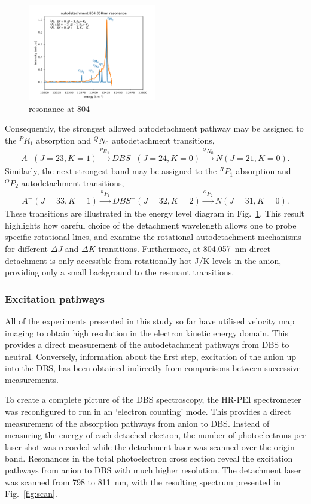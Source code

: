 \documentclass[journal=jpcafh,manuscript=article,layout=onecolumn, 12pt]{achemso}
\begin{document}
\begin{figure}
	\includegraphics[width=0.5\textwidth]{scripts/804}
	\caption{resonance at 804}
	\label{fig:804}
\end{figure}

Consequently, the strongest allowed autodetachment pathway may be assigned to the $^PR_1$ absorption and $^QN_0$ autodetachment transitions,
\begin{align*}
	A^-(J = 23, K=1) \xrightarrow{^PR_1} DBS^-(J=24,K=0) \xrightarrow{^QN_0} N(J=21, K=0).
\end{align*}
Similarly, the next strongest band may be assigned to the $^RP_1$ absorption and $^OP_2$ autodetachment transitions,
\begin{align*}
	A^-(J = 33, K=1) \xrightarrow{^RP_1} DBS^-(J=32,K=2) \xrightarrow{^OP_2} N(J=31, K=0).
\end{align*}
These transitions are illustrated in the energy level diagram in Fig.~\ref{fig:804}. This result highlights how careful choice of the detachment wavelength allows one to probe specific rotational lines, and examine the rotational autodetachment mechanisms for different $\Delta J$ and $\Delta K$ transitions. Furthermore, at 804.057~nm direct detachment is only accessible from rotationally hot J/K levels in the anion, providing only a small background to the resonant transitions.

\subsubsection{Excitation pathways}
All of the experiments presented in this study so far have utilised velocity map imaging to obtain high resolution in the electron kinetic energy domain. This provides a direct measurement of the autodetachment pathways from DBS to neutral. Conversely, information about the first step, excitation of the anion up into the DBS, has been obtained indirectly from comparisons between successive measurements. 

To create a complete picture of the DBS spectroscopy, the HR-PEI spectrometer was reconfigured to run in an `electron counting' mode. This provides a direct measurement of the absorption pathways from anion to DBS. Instead of measuring the energy of each detached electron, the number of photoelectrons per laser shot was recorded while the detachment laser was scanned over the origin band. Resonances in the total photoelectron cross section reveal the excitation pathways from anion to DBS with much higher resolution. The detachment laser was scanned from 798 to 811~nm, with the resulting spectrum presented in Fig.~\ref{fig:scan}.
\end{document}
